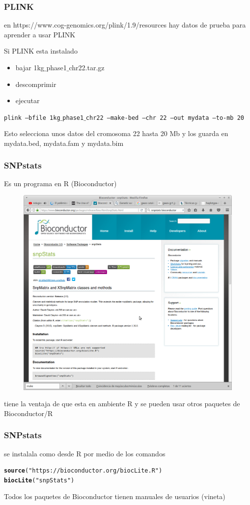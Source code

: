 \documentclass{beamer}\usepackage[]{graphicx}\usepackage[]{color}
\makeatletter
\newcommand{\hlstr}[1]{\textcolor[rgb]{0.192,0.494,0.8}{#1}}%
\newcommand{\hlstd}[1]{\textcolor[rgb]{0.345,0.345,0.345}{#1}}%
\newcommand{\hlkwd}[1]{\textcolor[rgb]{0.737,0.353,0.396}{\textbf{#1}}}%
\newenvironment{kframe}{%
 \def\at@end@of@kframe{}%
 \ifinner\ifhmode%
  \def\at@end@of@kframe{\end{minipage}}%
  \begin{minipage}{\columnwidth}%
 \fi\fi%
 \def\FrameCommand##1{\hskip\@totalleftmargin \hskip-\fboxsep
 \colorbox{shadecolor}{##1}\hskip-\fboxsep
     \hskip-\linewidth \hskip-\@totalleftmargin \hskip\columnwidth}%
 \MakeFramed {\advance\hsize-\width
   \@totalleftmargin\z@ \linewidth\hsize
   \@setminipage}}%
 {\par\unskip\endMakeFramed%
 \at@end@of@kframe}
\newenvironment{knitrout}{}{} %
\makeatother
\begin{document}
\begin{frame}[fragile]
\frametitle{PLINK}
en https://www.cog-genomics.org/plink/1.9/resources hay datos de prueba para aprender a usar PLINK

Si PLINK esta instalado
\begin{itemize}
\item bajar  1kg$\_$phase1$\_$chr22.tar.gz
\item descomprimir
\item ejecutar 
\end{itemize}

{\tt plink --bfile 1kg$\_$phase1$\_$chr22 --make-bed --chr 22 --out mydata --to-mb 20}

Esto selecciona unos datos del cromosoma 22 hasta 20 Mb y los guarda en mydata.bed, mydata.fam y mydata.bim
\end{frame}


\begin{frame}[fragile]
\frametitle{SNPstats}
Es un programa en R (Bioconductor)

\begin{figure}[htbp]
\begin{center}
\includegraphics[width=.6\linewidth]{snpstats.png}
\end{center}
\end{figure}

tiene la ventaja de que esta en ambiente R y se pueden usar otros paquetes de Bioconductor/R
\end{frame}



\begin{frame}[fragile]
\frametitle{SNPstats}

se instalala como desde R por medio de los comandos

\begin{knitrout}\footnotesize
{}\color{fgcolor}\begin{kframe}
\begin{alltt}
\hlkwd{source}\hlstd{(}\hlstr{"https://bioconductor.org/biocLite.R"}\hlstd{)}
\hlkwd{biocLite}\hlstd{(}\hlstr{"snpStats"}\hlstd{)}
\end{alltt}
\end{kframe}
\end{knitrout}
Todos los paquetes de Bioconductor tienen manuales de usuarios (vineta)

\end{frame}
\end{document}
